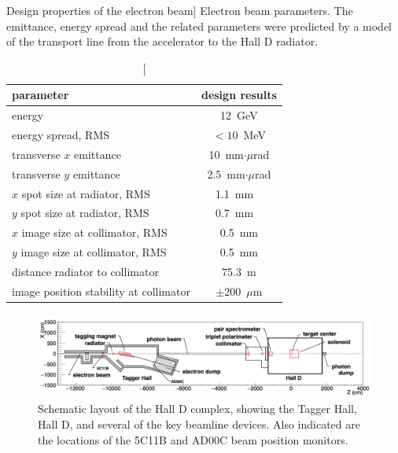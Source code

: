 \begin{table}[tbp]
\begin{center}
\caption
[Design properties of the electron beam]
{Electron beam parameters. The emittance, energy spread and
the related parameters were
predicted by a model of the transport line from
the accelerator to the Hall D radiator.}
\label{tab:elecprop}
\begin{tabular}{|l|c|}
\hline\hline
parameter & design results \\
\hline
energy & 12~GeV \\
energy spread, RMS & $<10$~MeV \\
transverse $x$ emittance & 10~mm$\cdot\mu$rad \\
transverse $y$ emittance & 2.5~mm$\cdot\mu$rad \\
$x$ spot size at radiator, RMS & 1.1~mm \ \\
$y$ spot size at radiator, RMS & 0.7~mm \ \\
$x$ image size at collimator, RMS & 0.5~mm \\
$y$ image size at collimator, RMS & 0.5~mm \\
distance radiator to collimator & 75.3~m \\
image position stability at collimator & $\pm$200~$\mu$m \\
\hline\hline
\end{tabular}
\end{center}
\end{table}



\begin{figure}[t]
\begin{center}
 \includegraphics[clip=true,width=0.98\linewidth]{figures/Draw_beamline.png}
\end{center}
\caption{Schematic layout of the Hall D complex, showing the Tagger Hall, Hall D, and several of the key beamline devices. Also indicated are the locations of the 5C11B and AD00C beam position monitors.
        }
\label{fig:beam:Draw_beamline} 
\end{figure}

